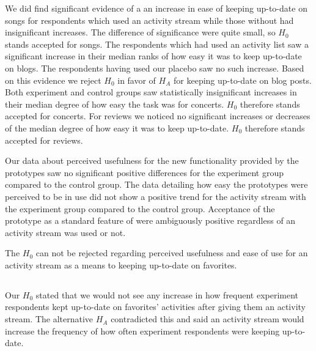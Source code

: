 \begin{items}
   We did find significant evidence
    of a an increase in ease of keeping up-to-date on songs for respondents
    which used an activity stream while those without had insignificant
    increases. The difference of significance were quite small, so $H_0$
    stands accepted for songs.
   The respondents which had used an activity list saw a
    significant increase in their median ranks of how easy it was
    to keep up-to-date on blogs. The respondents having used our placebo
    saw no such increase. Based on this evidence we reject $H_0$ in favor
    of $H_A$ for keeping up-to-date on blog posts.
   Both experiment and control groups saw
    statistically insignificant increases in their median degree of how easy
    the task was for concerts. $H_0$ therefore stands accepted for concerts.
   For reviews we noticed no significant increases or decreases
    of the median degree of how easy it was to keep up-to-date. 
    $H_0$ therefore stands accepted for reviews.
\end{items}

Our data about perceived usefulness for the new functionality provided
by the prototypes saw no significant positive differences for the experiment
group compared to the control group. The data detailing how easy the prototypes
were perceived to be in use did not show a positive trend for the activity
stream with the experiment group compared to the control group.
Acceptance of the prototype as a standard feature of \urort{} were ambiguously
positive regardless of an activity stream was used or not.

The $H_0$ can
not be rejected regarding perceived usefulness and ease of use for an activity
stream as a means to keeping up-to-date on favorites.

\subsection{%
}

Our $H_0$ stated that we would not see any increase in how frequent
experiment respondents kept up-to-date on favorites' activities after giving
them an activity stream. The alternative $H_A$ contradicted this and said
an activity stream would increase the frequency of how often experiment
respondents were keeping up-to-date.

